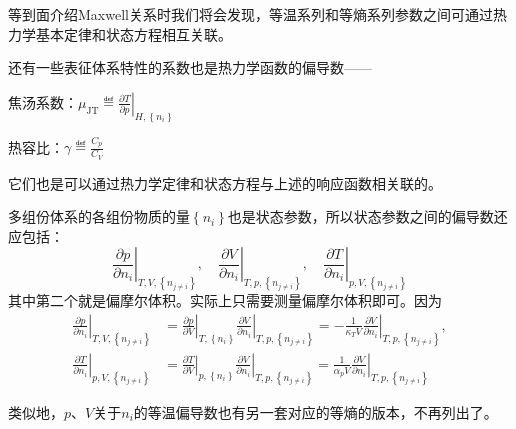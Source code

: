 \documentclass[main.tex]{subfiles}
\begin{document}
等到面介绍Maxwell关系时我们将会发现，等温系列和等熵系列参数之间可通过热力学基本定律和状态方程相互关联。

还有一些表征体系特性的系数也是热力学函数的偏导数——

焦汤系数：$\mu_\text{JT}\eqdef\left.\frac{\partial T}{\partial p}\right|_{H,\left\{n_i\right\}}$

热容比：$\gamma\eqdef\frac{C_p}{C_V}$

它们也是可以通过热力学定律和状态方程与上述的响应函数相关联的。

多组份体系的各组份物质的量$\left\{n_i\right\}$也是状态参数，所以状态参数之间的偏导数还应包括：
\[\left.\frac{\partial p}{\partial n_i}\right|_{T,V,\left\{n_{j\neq i}\right\}},\quad\left.\frac{\partial V}{\partial n_i}\right|_{T,p,\left\{n_{j\neq i}\right\}},\quad\left.\frac{\partial T}{\partial n_i}\right|_{p,V,\left\{n_{j\neq i}\right\}}\]
其中第二个就是偏摩尔体积。实际上只需要测量偏摩尔体积即可。因为
\begin{align*}
    \left.\frac{\partial p}{\partial n_i}\right|_{T,V,\left\{n_{j\neq i}\right\}} & =\left.\frac{\partial p}{\partial V}\right|_{T,\left\{n_i\right\}}\left.\frac{\partial V}{\partial n_i}\right|_{T,p,\left\{n_{j\neq i}\right\}}=-\frac{1}{\kappa_TV}\left.\frac{\partial V}{\partial n_i}\right|_{T,p,\left\{n_{j\neq i}\right\}}, \\
    \left.\frac{\partial T}{\partial n_i}\right|_{p,V,\left\{n_{j\neq i}\right\}} & =\left.\frac{\partial T}{\partial V}\right|_{p,\left\{n_i\right\}}\left.\frac{\partial V}{\partial n_i}\right|_{T,p,\left\{n_{j\neq i}\right\}}=\frac{1}{\alpha_p V}\left.\frac{\partial V}{\partial n_i}\right|_{T,p,\left\{n_{j\neq i}\right\}}
\end{align*}

类似地，$p$、$V$关于$n_i$的等温偏导数也有另一套对应的等熵的版本，不再列出了。
\end{document}
